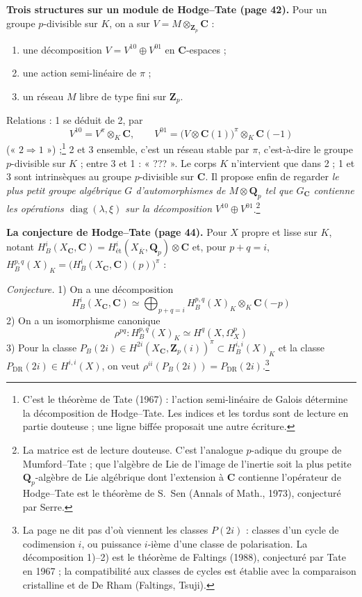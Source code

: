 \documentclass[11pt,a4paper]{article}
\begin{document}
\textbf{Trois structures sur un module de Hodge--Tate (page 42).} Pour un
groupe $p$-divisible sur $K$, on a sur $V = M \otimes_{\mathbf{Z}_p} \mathbf{C}$ :
\begin{enumerate}
\item une décomposition $V = V^{10} \oplus V^{01}$ en $\mathbf{C}$-espaces ;
\item une action semi-linéaire de $\pi$ ;
\item un réseau $M$ libre de type fini sur $\mathbf{Z}_p$.
\end{enumerate}
Relations : 1 se déduit de 2, par
\[
  V^{10} = V^\pi \otimes_K \mathbf{C}, \qquad
  V^{01} = \bigl(V \otimes \mathbf{C}(1)\bigr)^\pi \otimes_K \mathbf{C}(-1)
\]
(« $2 \Rightarrow 1$ ») ;\footnote{C'est le théorème de Tate (1967) : l'action
semi-linéaire de Galois détermine la décomposition de Hodge--Tate. Les indices
et les tordus sont de lecture en partie douteuse ; une ligne biffée proposait
une autre écriture.} 2 et 3 ensemble, c'est un réseau stable par $\pi$,
c'est-à-dire le groupe $p$-divisible sur $K$ ; entre 3 et 1 : « ??? ». Le corps
$K$ n'intervient que dans 2 ; 1 et 3 sont intrinsèques au groupe $p$-divisible
sur $\mathbf{C}$. Il propose enfin de regarder \emph{le plus petit groupe
algébrique $G$ d'automorphismes de $M \otimes \mathbf{Q}_p$ tel que
$G_{\mathbf{C}}$ contienne les opérations $\operatorname{diag}(\lambda, \xi)$
sur la décomposition $V^{10} \oplus V^{01}$}.\footnote{La matrice est de lecture
douteuse. C'est l'analogue $p$-adique du groupe de Mumford--Tate ; que l'algèbre
de Lie de l'image de l'inertie soit la plus petite $\mathbf{Q}_p$-algèbre de Lie
algébrique dont l'extension à $\mathbf{C}$ contienne l'opérateur de
Hodge--Tate est le théorème de S.~Sen (Annals of Math., 1973), conjecturé par
Serre.}

\textbf{La conjecture de Hodge--Tate (page 44).} Pour $X$ propre et lisse sur
$K$, notant $H^i_B(X_{\mathbf{C}}, \mathbf{C}) =
H^i_{\text{ét}}(X_{\bar K}, \mathbf{Q}_p) \otimes \mathbf{C}$ et, pour $p + q = i$,
$H^{p,q}_B(X)_K = \bigl(H^i_B(X_{\mathbf{C}}, \mathbf{C})(p)\bigr)^\pi$ :

\emph{Conjecture.} 1) On a une décomposition
\[
  \boxed{\;H^i_B(X_{\mathbf{C}}, \mathbf{C}) \simeq \bigoplus_{p+q=i}
  H^{p,q}_B(X)_K \otimes_K \mathbf{C}(-p)\;}
\]
2) On a un isomorphisme canonique
\[
  \boxed{\;\rho^{pq} : H^{p,q}_B(X)_K \simeq H^q(X, \Omega^p_X)\;}
\]
3) Pour la classe $P_B(2i) \in H^{2i}(X_{\mathbf{C}}, \mathbf{Z}_p(i))^\pi
\subset H^{i,i}_B(X)_K$ et la classe $P_{\mathrm{DR}}(2i) \in H^{i,i}(X)$, on
veut $\rho^{ii}(P_B(2i)) = P_{\mathrm{DR}}(2i)$.\footnote{La page ne dit pas
d'où viennent les classes $P(2i)$ : classes d'un cycle de codimension $i$, ou
puissance $i$-ième d'une classe de polarisation. La décomposition 1)--2) est le
théorème de Faltings (1988), conjecturé par Tate en 1967 ; la compatibilité aux
classes de cycles est établie avec la comparaison cristalline et de De Rham
(Faltings, Tsuji).}
\end{document}
